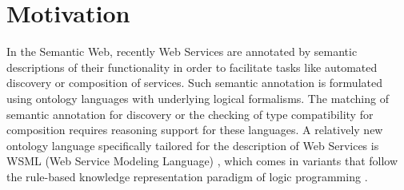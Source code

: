 \section{Motivation\label{sec:motivation}}

In the Semantic Web, recently Web Services are annotated by
semantic descriptions of their functionality in order to
facilitate tasks like automated discovery or composition of
services. Such semantic annotation is formulated using ontology
languages with underlying logical formalisms. The matching of
semantic annotation for discovery or the checking of type
compatibility for composition requires reasoning support for these
languages. A relatively new ontology language specifically
tailored for the description of Web Services is WSML (Web Service
Modeling Language) \cite{wsml}, which comes in variants that
follow the rule-based knowledge representation paradigm of logic
programming \cite{lloyd-FoundationsOfLP}.

